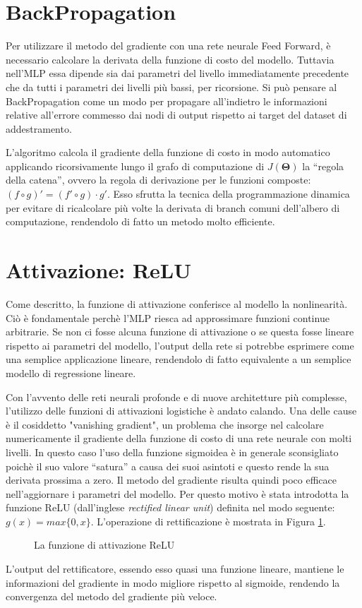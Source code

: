 \documentclass{standalone}
\begin{document}
\section{BackPropagation}
Per utilizzare il metodo del gradiente con una rete neurale Feed Forward, è
necessario calcolare la derivata della funzione di costo del modello. Tuttavia
nell'MLP essa dipende sia dai parametri del livello immediatamente precedente
che da tutti i parametri dei livelli più bassi, per ricorsione. Si può pensare
al BackPropagation come un modo per propagare all'indietro le informazioni
relative all'errore commesso dai nodi di output rispetto ai target del dataset
di addestramento.

L'algoritmo calcola il gradiente della funzione di costo in modo automatico
applicando ricorsivamente lungo il grafo di computazione di $J(\bm \Theta)$ la
``regola della catena'', ovvero la regola di derivazione per le funzioni
composte: $ (f \circ g)' = (f' \circ g)\cdot g' $. Esso sfrutta la tecnica
della programmazione dinamica per evitare di ricalcolare più volte la derivata
di branch comuni dell'albero di computazione, rendendolo di fatto un metodo
molto efficiente.
\section{Attivazione: ReLU}
Come descritto, la funzione di attivazione conferisce al modello la
nonlinearità. Ciò è fondamentale perchè l'MLP riesca ad approssimare funzioni
continue arbitrarie. Se non ci fosse alcuna funzione di attivazione o se questa
fosse lineare rispetto ai parametri del modello, l'output della rete si
potrebbe esprimere come una semplice applicazione lineare, rendendolo di fatto
equivalente a un semplice modello di regressione lineare.

Con l'avvento delle reti neurali profonde e di nuove architetture più
complesse, l'utilizzo delle funzioni di attivazioni logistiche è andato
calando. Una delle cause è il cosiddetto "vanishing gradient", un problema che
insorge nel calcolare numericamente il gradiente della funzione di costo di una
rete neurale con molti livelli. In questo caso l'uso della funzione sigmoidea è
in generale sconsigliato poichè il suo valore ``satura'' a causa dei suoi
asintoti e questo rende la sua derivata prossima a zero. Il metodo del
gradiente risulta quindi poco efficace nell'aggiornare i parametri del modello.
Per questo motivo è stata introdotta la funzione ReLU (dall'inglese
\emph{rectified linear unit}) definita nel modo seguente: 
$g(x) = max\{0, x\}$. L'operazione di rettificazione è mostrata in Figura
\ref{fig:relu}.
\begin{figure}[!htp]
  \caption{La funzione di attivazione ReLU}
  \label{fig:relu}
\end{figure}

L'output del rettificatore, essendo esso quasi una funzione lineare, mantiene
le informazioni del gradiente in modo migliore rispetto al sigmoide,
rendendo la convergenza del metodo del gradiente più veloce.
\end{document}
